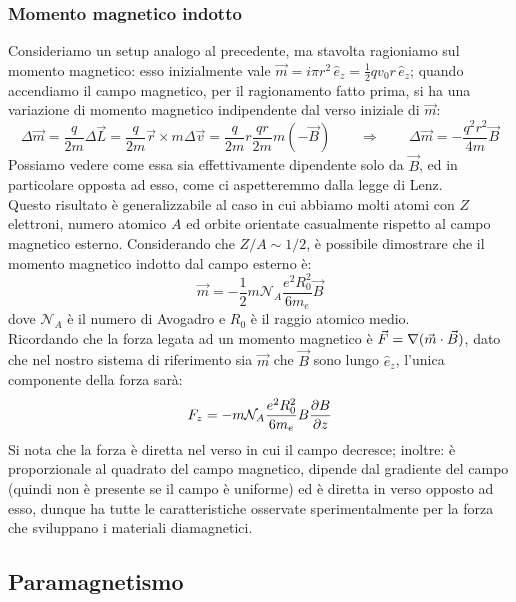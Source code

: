 \subsubsection{Momento magnetico indotto}

Consideriamo un setup analogo al precedente, ma stavolta ragioniamo sul momento magnetico: esso inizialmente vale $ \vec{m} = i \pi r^2 \,\hat{e}_z = \frac{1}{2}qv_0r\,\hat{e}_z $; quando accendiamo il campo magnetico, per il ragionamento fatto prima, si ha una variazione di momento magnetico indipendente dal verso iniziale di $ \vec{m} $:
\begin{equation}
	\Delta\vec{m} = \frac{q}{2m} \Delta\vec{L} = \frac{q}{2m} \vec{r}\times m\Delta\vec{v} = \frac{q}{2m} r\frac{qr}{2m}m(-\vec{B}) \qquad\Longrightarrow\qquad \Delta\vec{m} = - \frac{q^2 r^2}{4m} \vec{B}
	\label{eq:6}
\end{equation}
Possiamo vedere come essa sia effettivamente dipendente solo da $ \vec{B} $, ed in particolare opposta ad esso, come ci aspetteremmo dalla legge di Lenz. \\ 
%
Questo risultato è generalizzabile al caso in cui abbiamo molti atomi con $ Z $ elettroni, numero atomico $ A $ ed orbite orientate casualmente rispetto al campo magnetico esterno. Considerando che $ Z / A \sim 1 / 2 $, è possibile dimostrare che il momento magnetico indotto dal campo esterno è:
\begin{equation}
	\vec{m} = -\frac{1}{2} m \mathcal{N}_A \frac{e^2 R_0^2}{6 m_e} \vec{B}
	\label{eq:7}
\end{equation}
dove $ \mathcal{N}_A $ è il numero di Avogadro e $ R_0 $ è il raggio atomico medio. \\ 
%
Ricordando che la forza legata ad un momento magnetico è $ \vec{F} = \nabla(\vec{m}\cdot\vec{B}) $, dato che nel nostro sistema di riferimento sia $ \vec{m} $ che $ \vec{B} $ sono lungo $ \hat{e}_z $, l'unica componente della forza sarà:
\begin{equation}
	F_z = - m \mathcal{N}_A \frac{e^2 R_0^2}{6 m_e} B \frac{\partial B}{\partial z}
	\label{eq:8}
\end{equation}
Si nota che la forza è diretta nel verso in cui il campo decresce; inoltre: è proporzionale al quadrato del campo magnetico, dipende dal gradiente del campo (quindi non è presente se il campo è uniforme) ed è diretta in verso opposto ad esso, dunque ha tutte le caratteristiche osservate sperimentalmente per la forza che sviluppano i materiali diamagnetici.

\subsection{Paramagnetismo}

